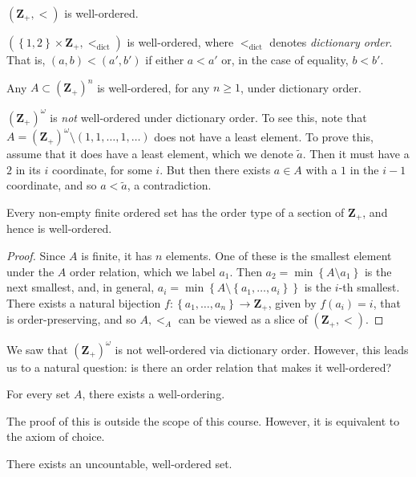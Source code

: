 \begin{example}
	$(\mathbf{Z}_{+}, <)$ is well-ordered.
\end{example}
\begin{example}
	$(\left\{ 1,2 \right\} \times \mathbf{Z}_{+}, <_{\text{dict}})$ is well-ordered,
	where $<_{\text{dict}}$ denotes \emph{dictionary order}. That is,
	$(a,b) < (a', b')$ if either $a < a'$ or, in the case of equality,
	$b < b'$.
\end{example}
\begin{example}
	Any $A \subset \left( \mathbf{Z}_{+} \right)^{n}$ is well-ordered, for any $n \ge 1$, under
	dictionary order.
\end{example}
\begin{remark}
	$(\mathbf{Z}_{+})^{\omega}$ is \emph{not} well-ordered under dictionary order.
	To see this, note that $A = (\mathbf{Z}_{+})^{\omega} \setminus (1, 1, \dots, 1,
	\dots)$ does not have a least element. To prove this, assume that it does
	have a least element, which we denote $\tilde{a}$.
	Then it must have a $2$ in its $i$ coordinate, for some $i$.
	But then there exists $a \in A$ with a $1$ in the $i-1$ coordinate, and
	so $a < \tilde{a}$, a contradiction.
\end{remark}
\begin{theorem}
	Every non-empty finite ordered set has the order type of a section of
	$\mathbf{Z}_{+}$, and hence is well-ordered.
\end{theorem}
\begin{proof}
	Since $A$ is finite, it has $n$ elements. One of these is the smallest
	element under the $A$ order relation, which we label $a_{1}$. Then $a_{2} = \min\left\{ A \setminus
	a_{1} \right\}$ is the next smallest, and, in general, $a_{i} = \min \left\{
	A \setminus \left\{ a_{1}, \dots, a_{i} \right\} \right\}$ is the $i$-th
	smallest. There exists a natural bijection $f: \left\{ a_{1}, \dots,
	a_{n} \right\} \to \mathbf{Z}_{+}$, given by $f(a_{i}) = i$, that is
	order-preserving, and so $A, <_{A}$ can be viewed as a slice of $(\mathbf{Z}_{+},
	<)$.
\end{proof}
We saw that $(\mathbf{Z}_{+})^{\omega}$ is not well-ordered via dictionary order.
However, this leads us to a natural question: is there an order relation that
makes it well-ordered?

\begin{theorem}[Zermelo]
	For every set $A$, there exists a well-ordering.
\end{theorem}
The proof of this is outside the scope of this course. However, it is equivalent
to the axiom of choice.
\begin{corollary}
	There exists an uncountable, well-ordered set.
\end{corollary}
